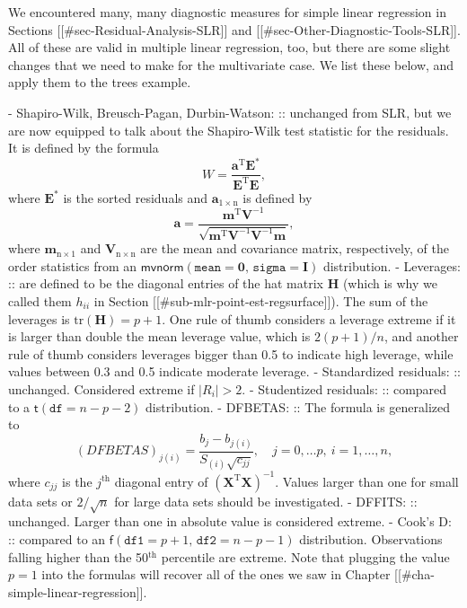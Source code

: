 We encountered many, many diagnostic measures for simple linear
regression in Sections [[#sec-Residual-Analysis-SLR]] and [[#sec-Other-Diagnostic-Tools-SLR]]. All of these are valid in multiple linear regression, too, but
there are some slight changes that we need to make for the
multivariate case. We list these below, and apply them to the trees
example.

- Shapiro-Wilk, Breusch-Pagan, Durbin-Watson: :: unchanged from SLR,
     but we are now equipped to talk about the Shapiro-Wilk test
     statistic for the residuals. It is defined by the formula
     \begin{equation}
     W=\frac{\mathbf{a}^{\mathrm{T}}\mathbf{E}^{\ast}}{\mathbf{E}^{\mathrm{T}}\mathbf{E}},
     \end{equation}
     where \(\mathbf{E}^{\ast}\) is the sorted residuals and
     \(\mathbf{a}_{1\times\mathrm{n}}\) is defined by
     \begin{equation}
     \mathbf{a}=\frac{\mathbf{m}^{\mathrm{T}}\mathbf{V}^{-1}}{\sqrt{\mathbf{m}^{\mathrm{T}}\mathbf{V}^{-1}\mathbf{V}^{-1}\mathbf{m}}},
     \end{equation}
     where \(\mathbf{m}_{\mathrm{n}\times1}\) and
     \(\mathbf{V}_{\mathrm{n}\times\mathrm{n}}\) are the mean and
     covariance matrix, respectively, of the order statistics from an
     \(\mathsf{mvnorm}\left(\mathtt{mean}=\mathbf{0},\,\mathtt{sigma}=\mathbf{I}\right)\)
     distribution.
- Leverages: :: are defined to be the diagonal entries of the hat
                matrix \(\mathbf{H}\) (which is why we called them
                \(h_{ii}\) in Section
                [[#sub-mlr-point-est-regsurface]]). The sum of the
                leverages is \(\mbox{tr}(\mathbf{H})=p+1\). One rule
                of thumb considers a leverage extreme if it is larger
                than double the mean leverage value, which is
                \(2(p+1)/n\), and another rule of thumb considers
                leverages bigger than 0.5 to indicate high leverage,
                while values between 0.3 and 0.5 indicate moderate
                leverage.
- Standardized residuals: :: unchanged. Considered extreme if
     \(|R_{i}|>2\).
- Studentized residuals: :: compared to a
     \(\mathsf{t}(\mathtt{df}=n-p-2)\) distribution.
- DFBETAS: :: The formula is generalized to
   \begin{equation}
   (DFBETAS)_{j(i)}=\frac{b_{j}-b_{j(i)}}{S_{(i)}\sqrt{c_{jj}}},\quad j=0,\ldots p,\ i=1,\ldots,n,
   \end{equation}
   where \(c_{jj}\) is the \(j^{\mathrm{th}}\) diagonal entry of
   \((\mathbf{X}^{\mathrm{T}}\mathbf{X})^{-1}\). Values
   larger than one for small data sets or \(2/\sqrt{n}\)
   for large data sets should be investigated.
- DFFITS: :: unchanged. Larger than one in absolute value is
             considered extreme.
- Cook's D: :: compared to an \(\mathsf{f}(\mathtt{df1} = p +
               1,\,\mathtt{df2} = n - p - 1)\)
               distribution. Observations falling higher than the
               50\(^{\textrm{th}}\) percentile are extreme.  Note that
               plugging the value \(p=1\) into the formulas will
               recover all of the ones we saw in Chapter
               [[#cha-simple-linear-regression]].

